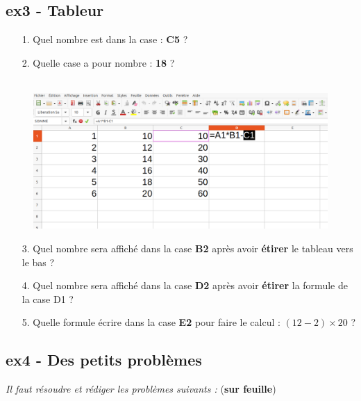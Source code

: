 \documentclass[11pt]{article}
\begin{document}
\begin{minipage}[t]{0.45\textwidth}
  \subsection*{ex3 - Tableur}

  \begin{enumerate}
    \item[1.] Quel nombre est dans la case : \textbf{C5} ? \dotfill
    \item[2.] Quelle case a pour nombre : \textbf{18} ? \dotfill
  \end{enumerate}

\end{minipage}
\begin{minipage}[t]{0.5\textwidth}

  \begin{figure}[H]
        \centering
        \includegraphics[width=\linewidth]{4x2-proportionnalite/ie-tableur.png}
  \end{figure}

\end{minipage}

\begin{enumerate}
  \item[3.] Quel nombre sera affiché dans la case \textbf{B2} après avoir \textbf{étirer} le tableau vers le bas ? \dotfill
  \item[4.] Quel nombre sera affiché dans la case \textbf{D2} après avoir \textbf{étirer} la formule de la case D1 ? \dotfill
  \item[5.] Quelle formule écrire dans la case \textbf{E2} pour faire le calcul : $(12-2) \times 20$ ? \dotfill
\end{enumerate}

\newpage

\subsection*{ex4 - Des petits problèmes}
\textit{Il faut résoudre et rédiger les problèmes suivants :} (\textbf{sur feuille})
\end{document}
